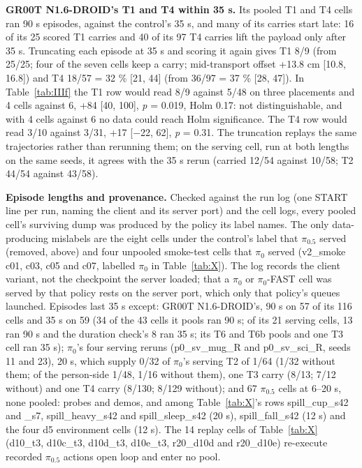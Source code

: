 \textbf{GR00T N1.6-DROID's T1 and T4 within 35 s.} Its pooled T1 and T4 cells ran 90 s episodes, against the control's 35 s, and many of its carries start late: 16 of its 25 scored T1 carries and 40 of its 97 T4 carries lift the payload only after 35 s. Truncating each episode at 35 s and scoring it again gives T1 8/9 (from 25/25; four of the seven cells keep a carry; mid-transport offset +13.8 cm [10.8, 16.8]) and T4 18/57 = 32 \% [21, 44] (from 36/97 = 37 \% [28, 47]). In Table~\ref{tab:IIIf} the T1 row would read 8/9 against 5/48 on three placements and 4 cells against 6, +84 [40, 100], \emph{p} = 0.019, Holm 0.17: not distinguishable, and with 4 cells against 6 no data could reach Holm significance. The T4 row would read 3/10 against 3/31, +17 [$-$22, 62], \emph{p} = 0.31. The truncation replays the same trajectories rather than rerunning them; on the serving cell, run at both lengths on the same seeds, it agrees with the 35 s rerun (carried 12/54 against 10/58; T2 44/54 against 43/58).

\textbf{Episode lengths and provenance.} Checked against the run log (one START line per run, naming the client and its server port) and the cell logs, every pooled cell's surviving dump was produced by the policy its label names. The only data-producing mislabels are the eight cells under the control's label that $\pi_{0.5}$ served (removed, above) and four unpooled smoke-test cells that $\pi_0$ served (v2\_smoke c01, c03, c05 and c07, labelled $\pi_0$ in Table~\ref{tab:X}). The log records the client variant, not the checkpoint the server loaded; that a $\pi_0$ or $\pi_0$-FAST cell was served by that policy rests on the server port, which only that policy's queues launched. Episodes last 35 s except: GR00T N1.6-DROID's, 90 s on 57 of its 116 cells and 35 s on 59 (34 of the 43 cells it pools ran 90 s; of its 21 serving cells, 13 ran 90 s and the duration check's 8 ran 35 s; its T6 and T6b pools and one T3 cell ran 35 s); $\pi_0$'s four serving reruns (p0\_sv\_mug\_R and p0\_sv\_sci\_R, seeds 11 and 23), 20 s, which supply 0/32 of $\pi_0$'s serving T2 of 1/64 (1/32 without them; of the person-side 1/48, 1/16 without them), one T3 carry (8/13; 7/12 without) and one T4 carry (8/130; 8/129 without); and 67 $\pi_{0.5}$ cells at 6--20 s, none pooled: probes and demos, and among Table~\ref{tab:X}'s rows spill\_cup\_s42 and \_s7, spill\_heavy\_s42 and spill\_sleep\_s42 (20 s), spill\_fall\_s42 (12 s) and the four d5 environment cells (12 s). The 14 replay cells of Table~\ref{tab:X} (d10\_t3, d10c\_t3, d10d\_t3, d10e\_t3, r20\_d10d and r20\_d10e) re-execute recorded $\pi_{0.5}$ actions open loop and enter no pool.

